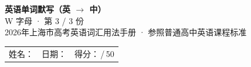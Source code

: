 \documentclass[10pt,a4paper]{article}
\begin{document}
\pagestyle{plain}

\begin{center}
{\LARGE\bfseries 英语单词默写（英 $\to$ 中）}\\[0.22em]
{\large W 字母 · 第 3 / 3 份}\\[0.18em]
{\small 2026年上海市高考英语词汇用法手册 · 参照普通高中英语课程标准}
\end{center}

\vspace{0.25em}
\noindent\begin{tabular}{@{}p{}@{}p{}@{}p{}@{}}
姓名：\underline{\hspace{2.0cm}} & 日期：\underline{\hspace{2.0cm}} & 得分：\underline{\hspace{1.3cm}}\,/\,50 \\
\end{tabular}

\vspace{0.3em}

\vspace{0.08em}
\end{document}
